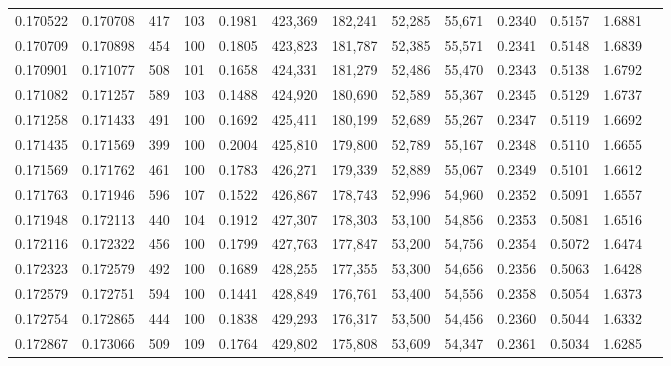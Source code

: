 \begin{tabular}{rrrrrrrrrrrrr}
0.170522 & 0.170708 &   417 & 103 &                                     0.1981 & 423,369 & 182,241 &  52,285 &  55,671 & 0.2340 & 0.5157 & 1.6881 \\
0.170709 & 0.170898 &   454 & 100 &                                     0.1805 & 423,823 & 181,787 &  52,385 &  55,571 & 0.2341 & 0.5148 & 1.6839 \\
0.170901 & 0.171077 &   508 & 101 &                                     0.1658 & 424,331 & 181,279 &  52,486 &  55,470 & 0.2343 & 0.5138 & 1.6792 \\
0.171082 & 0.171257 &   589 & 103 &                                     0.1488 & 424,920 & 180,690 &  52,589 &  55,367 & 0.2345 & 0.5129 & 1.6737 \\
0.171258 & 0.171433 &   491 & 100 &                                     0.1692 & 425,411 & 180,199 &  52,689 &  55,267 & 0.2347 & 0.5119 & 1.6692 \\
0.171435 & 0.171569 &   399 & 100 &                                     0.2004 & 425,810 & 179,800 &  52,789 &  55,167 & 0.2348 & 0.5110 & 1.6655 \\
0.171569 & 0.171762 &   461 & 100 &                                     0.1783 & 426,271 & 179,339 &  52,889 &  55,067 & 0.2349 & 0.5101 & 1.6612 \\
0.171763 & 0.171946 &   596 & 107 &                                     0.1522 & 426,867 & 178,743 &  52,996 &  54,960 & 0.2352 & 0.5091 & 1.6557 \\
0.171948 & 0.172113 &   440 & 104 &                                     0.1912 & 427,307 & 178,303 &  53,100 &  54,856 & 0.2353 & 0.5081 & 1.6516 \\
0.172116 & 0.172322 &   456 & 100 &                                     0.1799 & 427,763 & 177,847 &  53,200 &  54,756 & 0.2354 & 0.5072 & 1.6474 \\
0.172323 & 0.172579 &   492 & 100 &                                     0.1689 & 428,255 & 177,355 &  53,300 &  54,656 & 0.2356 & 0.5063 & 1.6428 \\
0.172579 & 0.172751 &   594 & 100 &                                     0.1441 & 428,849 & 176,761 &  53,400 &  54,556 & 0.2358 & 0.5054 & 1.6373 \\
0.172754 & 0.172865 &   444 & 100 &                                     0.1838 & 429,293 & 176,317 &  53,500 &  54,456 & 0.2360 & 0.5044 & 1.6332 \\
0.172867 & 0.173066 &   509 & 109 &                                     0.1764 & 429,802 & 175,808 &  53,609 &  54,347 & 0.2361 & 0.5034 & 1.6285 \\

\end{tabular}

